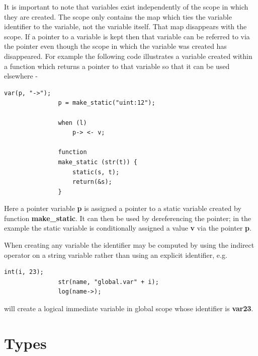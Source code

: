             It is important to note that variables exist independently of the
            scope in which they are created. The scope only contains the map
            which ties the variable identifier to the variable, not the
            variable itself. That map disappears with the scope. If a pointer
            to a variable is kept then that variable can be referred to via
            the pointer even though the scope in which the variable was
            created has disappeared. For example the following code illustrates
            a variable created within a function which returns a pointer to that
            variable so that it can be used elsewhere -
            \begin{lstlisting}[gobble=12, language=threepl]
               var(p, "->");
               p = make_static("uint:12");

               when (l)
                   p-> <- v;

               function
               make_static (str(t)) {
                   static(s, t);
                   return(&s);
               }
            \end{lstlisting}
            Here a pointer variable {\bf p} is assigned a pointer to a
            static variable created by function {\bf make\_static}. It can
            then be used by dereferencing the pointer; in the example the
            static variable is conditionally assigned a value {\bf v} via
            the pointer {\bf p}.
            
            \label{subsec:strvarcreat}
            When creating any variable the identifier may be computed
            by using the indirect operator on a string variable rather than
            using an explicit identifier, e.g.
            \begin{lstlisting}[gobble=12, language=threepl]
               int(i, 23);
               str(name, "global.var" + i);
               log(name->);
            \end{lstlisting}
            will create a logical immediate variable in global scope whose
            identifier is {\bf var23}.






    \section{Types}\label{sec:types}

